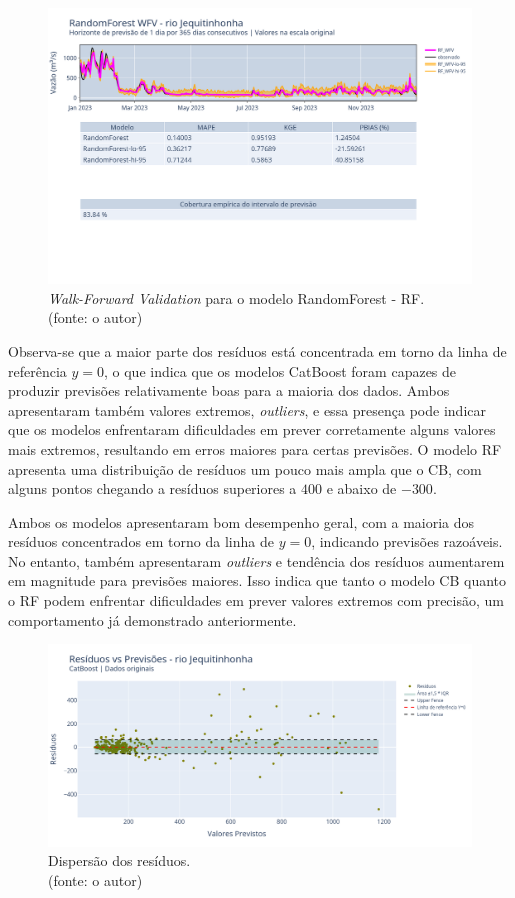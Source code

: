 \begin{figure}[!h]
\centering
\includegraphics[scale=0.33]{Figuras/jequiti/wfv/RF/RF_WFV_ORIG.png}
\caption{\textit{Walk-Forward Validation} para o modelo RandomForest - RF.\\(fonte: o autor)}
\label{fig:jequiti_RF_WFV_ORIG}
\end{figure}
\clearpage

Observa-se que a maior parte dos resíduos está concentrada em torno da linha de referência $y=0$, o que indica que os modelos CatBoost foram capazes de produzir previsões relativamente boas para a maioria dos dados. Ambos apresentaram também valores extremos, \textit{outliers}, e essa presença pode indicar que os modelos enfrentaram dificuldades em prever corretamente alguns valores mais extremos, resultando em erros maiores para certas previsões. O modelo RF apresenta uma distribuição de resíduos um pouco mais ampla que o CB, com alguns pontos chegando a resíduos superiores a $400$ e abaixo de $-300$.

Ambos os modelos apresentaram bom desempenho geral, com a maioria dos resíduos concentrados em torno da linha de $y=0$, indicando previsões razoáveis. No entanto, também apresentaram \textit{outliers} e tendência dos resíduos aumentarem em magnitude para previsões maiores. Isso indica que tanto o modelo CB quanto o RF podem enfrentar dificuldades em prever valores extremos com precisão, um comportamento já demonstrado anteriormente.

\begin{figure}[!h]
\centering
\includegraphics[scale=0.33]{Figuras/jequiti/wfv/CB/CB_WFV_ORIG_RESID_x_PREV.png}
\caption{Dispersão dos resíduos.\\(fonte: o autor)}
\label{fig:jequiti_CB_WFV_ORIG_RESID_x_PREV}
\end{figure}

